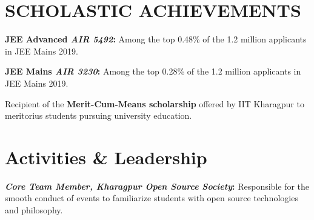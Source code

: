 \documentclass[]{deedy-resume-openfont}
\begin{document}
\begin{minipage}[t]{0.66\textwidth}
\section{SCHOLASTIC ACHIEVEMENTS}

\vspace{\topsep} %
\begin{tightemize}

\item\textbf{{JEE Advanced \emph{AIR 5492}:}} Among the top 0.48\% of the 1.2 million applicants in JEE Mains 2019.
\item\textbf{{JEE Mains \emph{AIR 3230}:}} Among the top 0.28\% of the 1.2 million applicants in JEE Mains 2019. 
\item Recipient of the \textbf{Merit-Cum-Means scholarship} offered by IIT Kharagpur to meritorius students pursuing university education.
\end{tightemize}



\section{Activities \& Leadership}

\vspace{\topsep} %
\begin{tightemize}


\item \textbf{{\emph{Core Team Member, Kharagpur Open Source Society}:}} Responsible for the smooth conduct of events to familiarize students with open source technologies and philosophy.
\vspace{\topsep} %

\vspace{\topsep} %

\end{tightemize}
\sectionsep

\end{minipage} 
\end{document}
